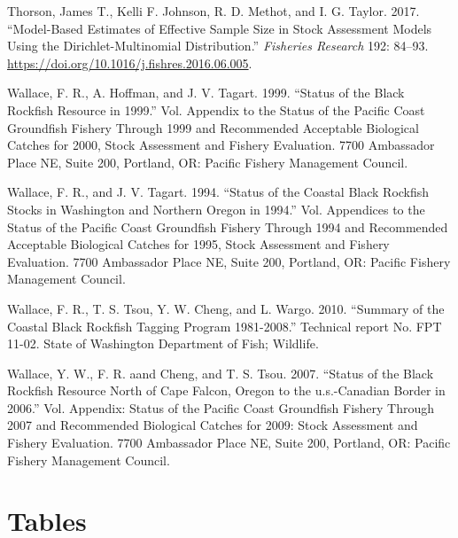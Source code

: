 \documentclass[11pt,
  english,
  letterpaper,
]{article}
\newlength{\cslhangindent}
\newenvironment{CSLReferences}[2] %
 {%
  \setlength{\parindent}{0pt}
  \ifodd #1 \everypar{\setlength{\hangindent}{\cslhangindent}}\ignorespaces\fi
  \ifnum #2 > 0
  \setlength{\parskip}{#2\baselineskip}
  \fi
 }%
 {}
\begin{document}
\begin{CSLReferences}{1}{0}
\leavevmode{}%
Thorson, James T., Kelli F. Johnson, R. D. Methot, and I. G. Taylor. 2017. {``Model-Based Estimates of Effective Sample Size in Stock Assessment Models Using the {Dirichlet}-Multinomial Distribution.''} \emph{Fisheries Research} 192: 84--93. \url{https://doi.org/10.1016/j.fishres.2016.06.005}.

\leavevmode{}%
Wallace, F. R., A. Hoffman, and J. V. Tagart. 1999. {``Status of the Black Rockfish Resource in 1999.''} Vol. Appendix to the Status of the Pacific Coast Groundfish Fishery Through 1999 and Recommended Acceptable Biological Catches for 2000, Stock Assessment and Fishery Evaluation. 7700 Ambassador Place NE, Suite 200, Portland, OR: Pacific Fishery Management Council.

\leavevmode{}%
Wallace, F. R., and J. V. Tagart. 1994. {``Status of the Coastal Black Rockfish Stocks in Washington and Northern Oregon in 1994.''} Vol. Appendices to the Status of the Pacific Coast Groundfish Fishery Through 1994 and Recommended Acceptable Biological Catches for 1995, Stock Assessment and Fishery Evaluation. 7700 Ambassador Place NE, Suite 200, Portland, OR: Pacific Fishery Management Council.

\leavevmode{}%
Wallace, F. R., T. S. Tsou, Y. W. Cheng, and L. Wargo. 2010. {``Summary of the Coastal Black Rockfish Tagging Program 1981-2008.''} Technical report No. FPT 11-02. State of Washington Department of Fish; Wildlife.

\leavevmode{}%
Wallace, Y. W., F. R. aand Cheng, and T. S. Tsou. 2007. {``Status of the Black Rockfish Resource North of Cape Falcon, Oregon to the u.s.-Canadian Border in 2006.''} Vol. Appendix: Status of the Pacific Coast Groundfish Fishery Through 2007 and Recommended Biological Catches for 2009: Stock Assessment and Fishery Evaluation. 7700 Ambassador Place NE, Suite 200, Portland, OR: Pacific Fishery Management Council.

\end{CSLReferences}

\clearpage

\hypertarget{tables}{%
\section{Tables}\label{tables}}
\end{document}
